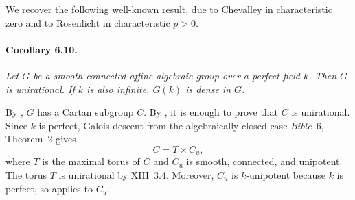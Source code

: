 We recover the following well-known result, due to Chevalley in
characteristic zero and to Rosenlicht in characteristic
\(p>0\).

\paragraph{\textbf{Corollary 6.10.}}
{\itshape Let \(G\) be a smooth connected affine algebraic group
over a perfect field \(k\). Then \(G\) is unirational. If \(k\)
is also infinite, \(G(k)\) is dense in \(G\).}

By , \(G\) has a Cartan subgroup \(C\). By , it is enough
to prove that \(C\) is unirational. Since \(k\) is perfect,
Galois descent from the algebraically closed case
\textup{\emph{Bible}~6, Theorem~2} gives
\[
  C=T\times C_u,
\]
where \(T\) is the maximal torus of \(C\) and \(C_u\) is smooth,
connected, and unipotent. The torus \(T\) is unirational by
XIII~3.4. Moreover, \(C_u\) is \(k\)-unipotent because \(k\) is
perfect, so  applies to \(C_u\).
